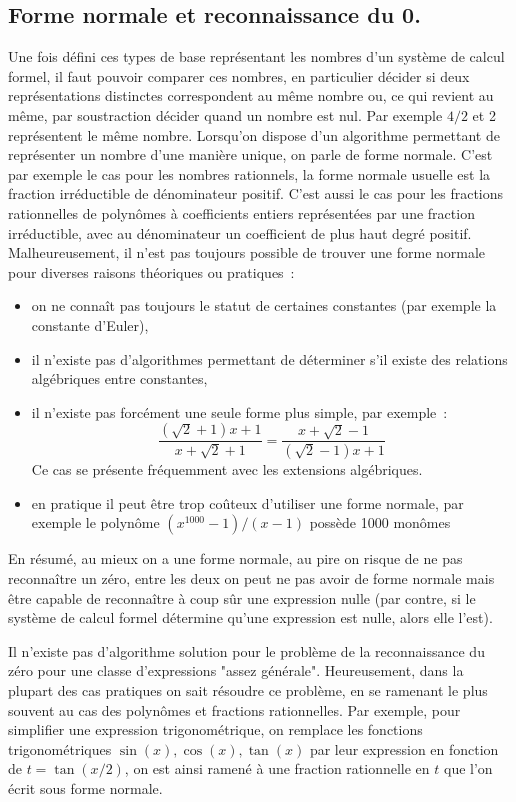 \documentclass[a4paper,11pt]{book}
\begin{document}
\begin{giacjshere}
\section{Forme normale et reconnaissance du 0.}
Une fois défini ces types de base représentant les nombres d'un système de 
calcul formel, il faut pouvoir comparer ces 
nombres, en particulier décider si deux représentations distinctes 
correspondent au m\^eme nombre ou, ce qui revient au 
m\^eme, par soustraction décider quand un nombre est nul. 
Par exemple $4/2$ et 2 représentent le m\^eme nombre. 
Lorsqu'on dispose d'un algorithme permettant de représenter un nombre 
d'une manière unique, on parle de forme normale. 
C'est par exemple le cas pour les nombres rationnels, la forme normale 
usuelle est la fraction irréductible de 
dénominateur positif. C'est aussi le cas pour les fractions rationnelles 
de polynômes à coefficients entiers représentées par une fraction 
irréductible, avec au dénominateur un coefficient de plus haut degré
positif.
Malheureusement, il n'est pas toujours possible de trouver une forme normale
pour diverses raisons théoriques ou pratiques~: 
\begin{itemize}
\item on ne connaît pas toujours le statut de certaines constantes
(par exemple la constante d'Euler),
\item il n'existe pas d'algorithmes permettant de déterminer
s'il existe des relations algébriques entre constantes,
\item il n'existe pas forcément une seule forme plus simple, par exemple~:
\[ \frac{(\sqrt{2}+1)x+1}{x+\sqrt{2}+1}=\frac{x+\sqrt{2}-1}{(\sqrt{2}-1)x+1} \]
Ce cas se présente fréquemment avec les extensions algébriques.
\item en pratique il peut être trop coûteux d'utiliser une forme
normale, par exemple le polynôme $(x^{1000}-1)/(x-1)$ possède 1000 monômes
\end{itemize}
En résumé, au mieux on a une forme normale, au pire on risque de ne pas 
reconnaître un zéro, entre les deux on peut ne
pas avoir de forme normale mais être capable de reconnaître à coup sûr 
une expression nulle (par contre, si le système 
de calcul formel détermine qu'une expression est nulle, alors elle l'est).

Il n'existe pas d'algorithme solution
pour le problème de la reconnaissance du zéro pour une classe 
d'expressions "assez générale". Heureusement, 
dans la plupart des cas pratiques on sait résoudre ce problème, en
se ramenant le plus souvent au cas des polynômes et fractions rationnelles.
Par exemple, pour simplifier une expression trigonométrique,
on remplace les fonctions trigonométriques $\sin(x), \cos(x), \tan(x)$
par leur expression en fonction de $t=\tan(x/2)$, on est ainsi ramené
à une fraction rationnelle en $t$ que l'on écrit sous forme normale.


\end{giacjshere}
\end{document}
